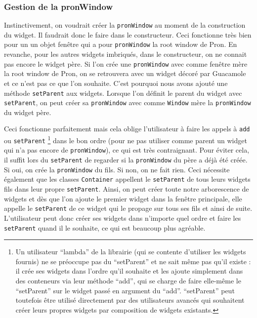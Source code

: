 \subsubsection{Gestion de la pronWindow}

Instinctivement, on voudrait créer la \verb|pronWindow| au moment de la construction du widget.
Il faudrait donc le faire dans le constructeur.
Ceci fonctionne très bien pour un un objet fenêtre qui a pour \verb|pronWindow| la root window de Pron.
En revanche, pour les autres widgets imbriqués, dans le constructeur, on ne connait pas encore le widget père.
Si l'on crée une \verb|pronWindow| avec comme fenêtre mère la root window de Pron, on se retrouvera avec un widget décoré par Guacamole et ce n'est pas ce que l'on souhaite.
C'est pourquoi nous avons ajouté une méthode \verb|setParent| aux widgets.
Lorsque l'on définit le parent du widget avec \verb|setParent|, on peut créer sa \verb|pronWindow| avec comme \verb|Window| mère la \verb|pronWindow| du widget père.

Ceci fonctionne parfaitement mais cela oblige l'utilisateur à faire les appels à \verb|add| ou \verb|setParent|
\footnote{Un utilisateur ``lambda'' de la librairie (qui se contente d'utiliser les widgets fournis) ne se préoccupe pas du ``setParent'' et ne sait même pas qu'il existe : il crée ses widgets dans l'ordre qu'il souhaite et les ajoute simplement dans des conteneurs via leur méthode ``add'', qui se charge de faire elle-même le ``setParent'' sur le widget passé en argument du ``add''. ``setParent'' peut toutefois être utilisé directement par des utilisateurs avancés qui souhaitent créer leurs propres widgets par composition de widgets existants.}
dans le bon ordre (pour ne pas utiliser comme parent un widget qui n'a pas encore de \verb|pronWindow|), ce qui est très contraignant.
Pour éviter cela, il suffit lors du \verb|setParent| de regarder si la \verb|pronWindow| du père a déjà été créée.
Si oui, on crée la \verb|pronWindow| du fils.
Si non, on ne fait rien.
Ceci nécessite également que les classes \verb|Container| appellent le \verb|setParent| de tous leurs widgets fils dans leur propre \verb|setParent|.
Ainsi, on peut créer toute notre arborescence de widgets et dès que l'on ajoute le premier widget dans la fenêtre principale, elle appelle le \verb|setParent| de ce widget qui le propage sur tous ses fils et ainsi de suite.
L'utilisateur peut donc créer ses widgets dans n'importe quel ordre et faire les \verb|setParent| quand il le souhaite, ce qui est beaucoup plus agréable.


